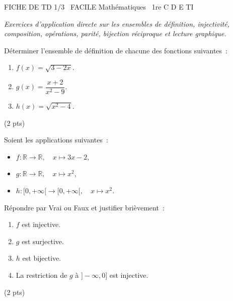 \documentclass[11pt]{article}
\begin{document}
\begin{tcolorbox}[enhanced,colback=popink,colframe=popink,arc=10pt,boxrule=0pt,left=12pt,right=12pt,top=9pt,bottom=9pt]
{\color{white}\popxbold\small FICHE DE TD 1/3 \textbullet\ FACILE \hfill Mathématiques \textbullet\ 1re C D E TI\par}
\end{tcolorbox}
\vspace{4pt}
\emph{Exercices d'application directe sur les ensembles de définition, injectivité, composition, opérations, parité, bijection réciproque et lecture graphique.}

\begin{exercice}
Déterminer l'ensemble de définition de chacune des fonctions suivantes~:
\begin{enumerate}
    \item $f(x) = \sqrt{3 - 2x}$.
    \item $g(x) = \dfrac{x + 2}{x^2 - 9}$.
    \item $h(x) = \sqrt{x^2 - 4}$.
\end{enumerate}
(2 pts)
\end{exercice}

\begin{exercice}
Soient les applications suivantes~:
\begin{itemize}
    \item $f : \mathbb{R} \to \mathbb{R},\quad x \mapsto 3x - 2$,
    \item $g : \mathbb{R} \to \mathbb{R},\quad x \mapsto x^2$,
    \item $h : [0, +\infty[ \to [0, +\infty[,\quad x \mapsto x^2$.
\end{itemize}
Répondre par Vrai ou Faux et justifier brièvement~:
\begin{enumerate}
    \item $f$ est injective.
    \item $g$ est surjective.
    \item $h$ est bijective.
    \item La restriction de $g$ à $]-\infty, 0]$ est injective.
\end{enumerate}
(2 pts)
\end{exercice}
\end{document}
